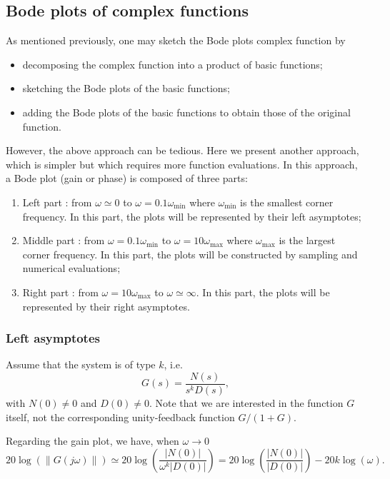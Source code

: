 \documentclass[a4paper,11pt]{report}
\theoremstyle{definition}
\begin{document}
\subsection{Bode plots of complex functions}
\label{sec:bode-complex}

As mentioned previously, one may sketch the Bode plots complex
function by
\begin{itemize}
\item decomposing the complex function into a product of basic functions;
\item sketching the Bode plots of the basic functions;
\item adding the Bode plots of the basic functions to obtain those of the
  original function.
\end{itemize}

However, the above approach can be tedious. Here we present another
approach, which is simpler but which requires more function
evaluations. In this approach, a Bode plot (gain or phase) is composed
of three parts:
\begin{enumerate}
\item Left part : from $\omega \simeq 0$ to
  $\omega=0.1\omega_{\min}$ where $\omega_{\min}$ is the smallest
  corner frequency. In this part, the plots will be represented by their
  left asymptotes;
\item Middle part : from $\omega=0.1\omega_{\min}$ to
  $\omega=10\omega_{\max}$ where $\omega_{\max}$ is the largest corner
  frequency. In this part, the plots will be constructed by sampling
  and numerical evaluations;
\item Right part : from $\omega=10\omega_{\max}$ to
  $\omega\simeq\infty$. In this part, the plots will be represented by
  their right asymptotes.
\end{enumerate}

\subsubsection{Left asymptotes}

Assume that the system is of type $k$, i.e.
\[
G(s) = \frac{N(s)}{s^kD(s)},
\]
with $N(0)\neq 0$ and $D(0)\neq 0$. Note that we are interested in the
function $G$ itself, not the corresponding unity-feedback function
$G/(1+G)$. 

Regarding the gain plot, we have, when $\omega\to 0$
\[
20\log(\|G(j\omega)\|) \simeq
20\log\left(\frac{|N(0)|}{\omega^k|D(0)|}\right)
= 20\log\left(\frac{|N(0)|}{|D(0)|}\right) - 20k\log(\omega).
\]
\end{document}

